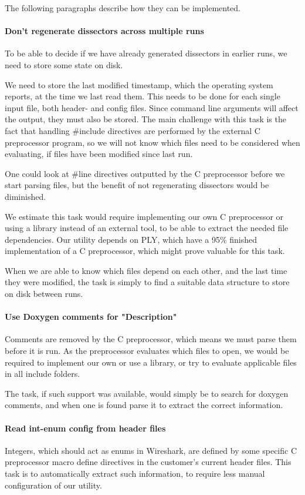 \noindent The following paragraphs describe how they can be implemented.
\paragraph{Don't regenerate dissectors across multiple runs}
To be able to decide if we have already generated dissectors in earlier runs, we need to store some state on disk. 

We need to store the last modified timestamp, which the operating system reports, at the time we last read them. 
This needs to be done for each single input file, both header- and config files.
Since command line arguments will affect the output, they must also be stored. The main challenge with this task is the fact that handling \#include directives are performed by the external C preprocessor program, so we will not know which files need to be considered when evaluating, if files have been modified since last run.

One could look at \#line directives outputted by the C preprocessor before we start parsing files, but the benefit of not regenerating dissectors would be diminished.

We estimate this task would require implementing our own C preprocessor or using a library instead of an external tool, to be able to extract the needed file dependencies. Our utility depends on PLY, which have a 95\% finished implementation of a C preprocessor, which might prove valuable for this task.

When we are able to know which files depend on each other, and the last time they were modified, the task is simply to find a suitable data structure to store on disk between runs.

\paragraph{Use Doxygen comments for "Description"}
Comments are removed by the C preprocessor, which means we must parse them before it is run. As the preprocessor evaluates which files to open, we would be required to implement our own or use a library, or try to evaluate applicable files in all include folders.

The task, if such support was available, would simply be to search for doxygen comments, and when one is found parse it to extract the correct information.

\paragraph{Read int-enum config from header files}
Integers, which should act as enums in Wireshark, are defined by some specific C preprocessor macro define directives in the customer's current header files. This task is to automatically extract such information, to require less manual configuration of our utility.

